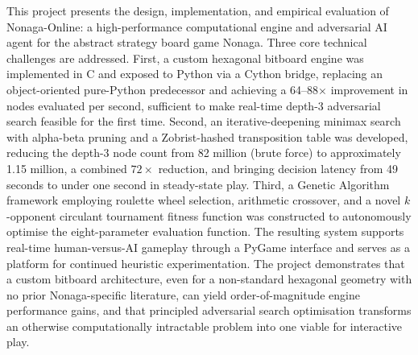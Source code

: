 This project presents the design, implementation, and empirical evaluation of Nonaga-Online: a high-performance computational engine and adversarial AI agent for the abstract strategy board game Nonaga. Three core technical challenges are addressed. First, a custom hexagonal bitboard engine was implemented in C and exposed to Python via a Cython bridge, replacing an object-oriented pure-Python predecessor and achieving a 64--88$\times$ improvement in nodes evaluated per second, sufficient to make real-time depth-3 adversarial search feasible for the first time. Second, an iterative-deepening minimax search with alpha-beta pruning and a Zobrist-hashed transposition table was developed, reducing the depth-3 node count from 82 million (brute force) to approximately 1.15 million, a combined $72\times$ reduction, and bringing decision latency from 49 seconds to under one second in steady-state play. Third, a Genetic Algorithm framework employing roulette wheel selection, arithmetic crossover, and a novel $k$-opponent circulant tournament fitness function was constructed to autonomously optimise the eight-parameter evaluation function. The resulting system supports real-time human-versus-AI gameplay through a PyGame interface and serves as a platform for continued heuristic experimentation. The project demonstrates that a custom bitboard architecture, even for a non-standard hexagonal geometry with no prior Nonaga-specific literature, can yield order-of-magnitude engine performance gains, and that principled adversarial search optimisation transforms an otherwise computationally intractable problem into one viable for interactive play.